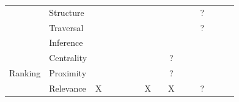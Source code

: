 \begin{table}[htbp]
\begin{tabular}{rrcccccccccccccc}
    \multicolumn{1}{l}{} & \multicolumn{1}{l}{Structure } &       &       &       &       &       &       &       &       &       &       & ?     &       &       &  \\
    \multicolumn{1}{l}{} & \multicolumn{1}{l}{Traversal} &       &       &       &       &       &       &       &       &       &       & ?     &       &       &  \\
    \multicolumn{1}{l}{} & \multicolumn{1}{l}{Inference} &       &       &       &       &       &       &       &       &       &       &       &       &       &  \\
    \multicolumn{1}{l}{\multirow{3}[0]{*}{Ranking}} & \multicolumn{1}{l}{Centrality} &       &       &       &       &       &       &       & ?     &       &       &       &       &       &  \\
    \multicolumn{1}{l}{} & \multicolumn{1}{l}{Proximity} &       &       &       &       &       &       &       & ?     &       &       &       &       &       &  \\
    \multicolumn{1}{l}{} & \multicolumn{1}{l}{Relevance} & X     &       &       &       &       & X     &       & X     &       &       & ?     &       &       &  \\
    \end{tabular}%
  \label{tab:examples}%
\end{table}%


